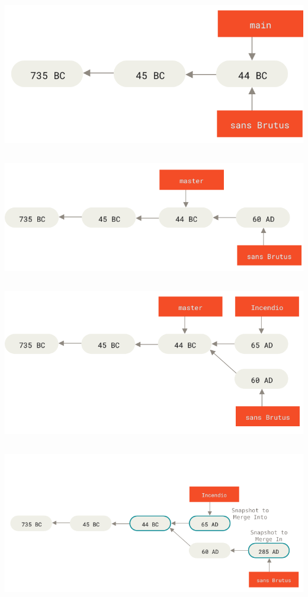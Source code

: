 \includegraphics{figs/timeline1.png}

\subsection{}

\includegraphics{figs/timeline2.png}

\subsection{}

\includegraphics{figs/timeline3.png}

\subsection{}

\includegraphics{figs/timeline4.png}

